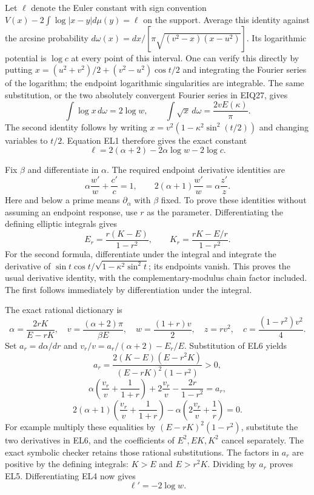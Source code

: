 \documentclass[10pt]{article}
\begin{document}
Let \(\ell\) denote the Euler constant with sign convention \(V(x)-2\int\log|x-y|d\mu(y)=\ell\) on the support. Average this identity against the arcsine probability \(d\omega(x)=dx/[\pi\sqrt{(v^2-x)(x-u^2)}]\). Its logarithmic potential is \(\log c\) at every point of this interval. One can verify this directly by putting \(x=(u^2+v^2)/2+(v^2-u^2)\cos t/2\) and integrating the Fourier series of the logarithm; the endpoint logarithmic singularities are integrable. The same substitution, or the two absolutely convergent Fourier series in EIQ27, gives \[
 \int\log x\,d\omega=2\log w,\qquad
 \int\sqrt{x}\,d\omega=\frac{2vE(\kappa)}\pi.
\] The second identity follows by writing \(x=v^2(1-\kappa^2\sin^2(t/2))\) and changing variables to \(t/2\). Equation EL1 therefore gives the exact constant \[
 \ell=2(\alpha+2)-2\alpha\log w-2\log c.
 \tag{EL4}
\]

Fix \(\beta\) and differentiate in \(\alpha\). The required endpoint derivative identities are \[
 \alpha\frac{w'}w+\frac{c'}c=1,
 \qquad 2(\alpha+1)\frac{w'}w=\alpha\frac{z'}z.
 \tag{EL5}
\] Here and below a prime means \(\partial_\alpha\) with \(\beta\) fixed. To prove these identities without assuming an endpoint response, use \(r\) as the parameter. Differentiating the defining elliptic integrals gives \[
 E_r=\frac{r(K-E)}{1-r^2},\qquad
 K_r=\frac{rK-E/r}{1-r^2}.
 \tag{EL6}
\] For the second formula, differentiate under the integral and integrate the derivative of \(\sin t\cos t/\sqrt{1-\kappa^2\sin^2t}\); its endpoints vanish. This proves the usual derivative identity, with the complementary-modulus chain factor included. The first follows immediately by differentiation under the integral.

The exact rational dictionary is \[
 \alpha=\frac{2rK}{E-rK},\quad
 v=\frac{(\alpha+2)\pi}{\beta E},\quad
 w=\frac{(1+r)v}{2},\quad z=rv^2,\quad c=\frac{(1-r^2)v^2}{4}.
\] Set \(a_r=d\alpha/dr\) and \(v_r/v=a_r/(\alpha+2)-E_r/E\). Substitution of EL6 yields \[
 a_r=\frac{2(K-E)(E-r^2K)}{(E-rK)^2(1-r^2)}>0,
\] \[
 \alpha\left(\frac{v_r}v+\frac1{1+r}\right)
 +2\frac{v_r}v-\frac{2r}{1-r^2}=a_r,
\] \[
 2(\alpha+1)\left(\frac{v_r}v+\frac1{1+r}\right)
 -\alpha\left(2\frac{v_r}v+\frac1r\right)=0.
 \tag{EL7}
\] For example multiply these equalities by \((E-rK)^2(1-r^2)\), substitute the two derivatives in EL6, and the coefficients of \(E^2,EK,K^2\) cancel separately. The exact symbolic checker retains those rational substitutions. The factors in \(a_r\) are positive by the defining integrals: \(K>E\) and \(E>r^2K\). Dividing by \(a_r\) proves EL5. Differentiating EL4 now gives \[
 \ell'=-2\log w.
 \tag{EL8}
\]
\end{document}
